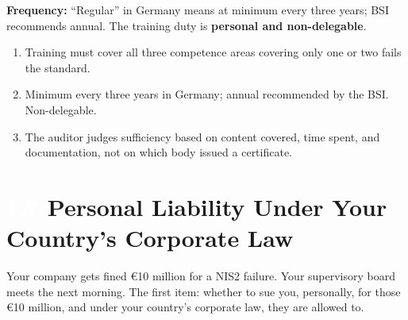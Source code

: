\documentclass[11pt,a4paper,twoside]{book}
\newcommand{\lessontag}[1]{%
  \texorpdfstring{%
    \setlength{\fboxsep}{3pt}\colorbox{nisd2blue}{\textcolor{white}{\footnotesize\bfseries #1}}\quad%
  }{Lesson #1\ }%
}
\begin{document}
\begin{center}
\par\smallskip{}
\end{center}

\textbf{Frequency:} ``Regular'' in Germany means at minimum every three years; BSI recommends annual. The training duty is \textbf{personal and non-delegable}.

\begin{keytakeaways}
\begin{enumerate}
  \item Training must cover all three competence areas covering only one or two fails the standard.
  \item Minimum every three years in Germany; annual recommended by the BSI. Non-delegable.
  \item The auditor judges sufficiency based on content covered, time spent, and documentation, not on which body issued a certificate.
\end{enumerate}
\end{keytakeaways}

\section{\lessontag{1.7}Personal Liability Under Your Country's Corporate Law}

Your company gets fined €10 million for a NIS2 failure. Your supervisory board meets the next morning. The first item: whether to sue you, personally, for those €10 million, and under your country's corporate law, they are allowed to.
\end{document}
